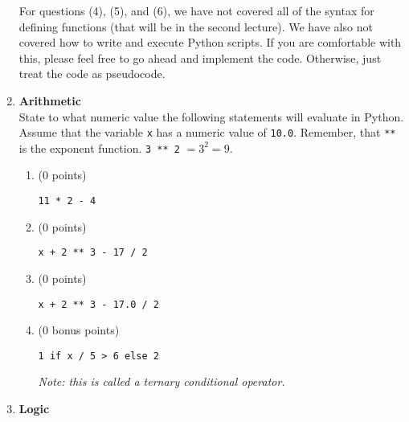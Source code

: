 \documentclass{article}
\newcounter{points}
\newcounter{bonuspoints}
\newcommand\setzeropoints{\addtocounter{points}{0}(0 points)}
\newcommand\setzerobonuspoints{\addtocounter{bonuspoints}{0}(0 bonus points)}
\begin{document}
\begin{enumerate}
For questions (4), (5), and (6), we have not covered all of the syntax for defining functions (that will be in the second lecture).  We have also not covered how to write and execute Python scripts.  If you are comfortable with this, please feel free to go ahead and implement the code.  Otherwise, just treat the code as pseudocode.

\item \textbf{Arithmetic} \\
State to what numeric value the following statements will evaluate in Python.  Assume that the variable \texttt{x} has a numeric value of \texttt{10.0}.  Remember, that \texttt{**} is the exponent function.  \texttt{3 ** 2} $= 3^2 = 9$.

\begin{enumerate}
\setcounter{enumii}{0}
\item \setzeropoints \\
\begin{lstlisting}
11 * 2 - 4
\end{lstlisting}
\end{enumerate}

\begin{enumerate}
\setcounter{enumii}{1}
\item \setzeropoints \\ 
\begin{lstlisting}
x + 2 ** 3 - 17 / 2
\end{lstlisting}
\end{enumerate}

\begin{enumerate}
\setcounter{enumii}{2}
\item \setzeropoints \\
\begin{lstlisting}
x + 2 ** 3 - 17.0 / 2
\end{lstlisting}
\end{enumerate}

\begin{enumerate}
\setcounter{enumii}{3}
\item \setzerobonuspoints \\
\begin{lstlisting}
1 if x / 5 > 6 else 2
\end{lstlisting}
\emph{Note: this is called a ternary conditional operator.}
\end{enumerate}

\item \textbf{Logic} \\


\end{enumerate}
\end{document}
